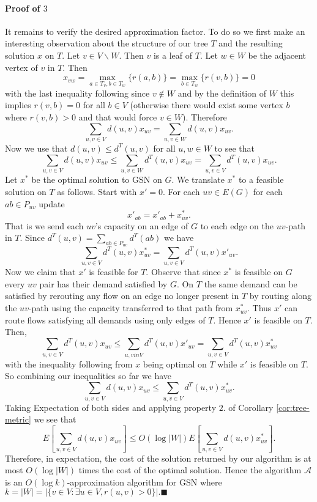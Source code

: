 \documentclass[letterpaper,12pt,oneside,onecolumn]{article}
\newcommand{\cA}{\mathcal{A}} \newcommand{\cB}{\mathcal{B}}
\begin{document}
\paragraph{Proof of $3$}
It remains to verify the desired approximation factor. To do so we first make an interesting observation about the structure of our tree $T$ and the resulting solution $x$ on $T$. Let $v \in V\backslash W$. Then $v$ is a leaf of $T$. Let $w \in W$ be the adjacent vertex of $v$ in $T$. Then
$$x_{vw} = \max_{a \in T_v, b \in T_w} \{r(a,b)\} = \max_{b \in T_w} \{r(v, b)\} = 0$$
with the last inequality following since $v \not\in W$ and by the definition of $W$ this implies $r(v,b) = 0$ for all $b \in V$ (otherwise there would exist some vertex $b$ where $r(v,b) > 0$ and that would force $v \in W$). Therefore
$$\sum_{u,v \in V} d(u,v) x_{uv} = \sum_{u,v \in W} d(u,v) x_{uv} .$$
Now we use that $d(u,v) \leq d^T(u,v)$ for all $u,w \in W$ to see that
$$\sum_{u,v \in V} d(u,v) x_{uv} \leq \sum_{u,v \in W} d^T(u,v) x_{uv} = \sum_{u,v \in V} d^T(u,v) x_{uv}.$$
Let $x^*$ be the optimal solution to GSN on $G$. We translate $x^*$ to a feasible solution on $T$ as follows. Start with $x' = 0$. For each $uv \in E(G)$ for each $ab \in P_{uv}$ update
$$x'_{ab} = x'_{ab} + x^*_{uv}.$$
That is we send each $uv$'s capacity on an edge of $G$ to each edge on the $uv$-path in $T$. Since $d^T(u,v) = \sum_{ab \in P_{uv}} d^T(ab)$ we have
$$\sum_{u,v \in V} d^T(u,v) x^*_{uv} = \sum_{u,v \in V} d^T(u,v) x'_{uv}.$$
Now we claim that $x'$ is feasible for $T$. Observe that since $x^*$ is feasible on $G$ every $uv$ pair has their demand satisfied by $G$. On $T$ the same demand can be satisfied by rerouting any flow on an edge no longer present in $T$ by routing along the $uv$-path using the capacity transferred to that path from $x^*_{uv}$. Thus $x'$ can route flows satisfying all demands using only edges of $T$. Hence $x'$ is feasible on $T$. Then,
$$\sum_{u,v\in V} d^T(u,v) x_{uv} \leq \sum_{u,v in V} d^T(u,v) x'_{uv} = \sum_{u,v \in V} d^T(u,v) x^*_{uv}$$
with the inequality following from $x$ being optimal on $T$ while $x'$ is feasible on $T$. So combining our inequalities so far we have
$$ \sum_{u,v \in V} d(u,v) x_{uv} \leq \sum_{u,v \in V} d^T(u,v) x^*_{uv}.$$
Taking Expectation of both sides and applying property $2.$ of Corollary \ref{cor:tree-metric} we see that
$$E[\sum_{u,v \in V} d(u,v) x_{uv}] \leq O(\log |W|) E[\sum_{u,v\in V} d(u,v) x^*_{uv}].$$
Therefore, in expectation, the cost of the solution returned by our algorithm is at most $O(\log |W|)$ times the cost of the optimal solution.
Hence the algorithm $\cA$ is an $O(\log k)$-approximation algorithm for GSN where $k = |W| = |\{ v \in V: \exists u \in V, r(u,v) > 0 \}|.\blacksquare$
\end{document}
